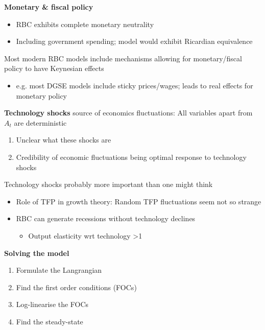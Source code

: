 \documentclass{beamer}
\begin{document}
\begin{frame}
  \textbf{Monetary \& fiscal policy}\\
   \begin{itemize}
     \item RBC exhibits complete monetary neutrality
     \item Including government spending; model would exhibit Ricardian equivalence
   \end{itemize}
   \medskip
    Most modern RBC models include mechanisms allowing for monetary/fiscal policy to have Keynesian effects
  \begin{itemize}
    \item e.g. most DGSE models include sticky prices/wages; leads to real effects for monetary policy
  \end{itemize}
\end{frame}

\begin{frame}
  \textbf{Technology shocks} source of economics fluctuations: All variables apart from $A_t$ are deterministic
  \begin{enumerate}
    \item Unclear what these shocks are
    \item Credibility of economic fluctuations being optimal response to technology shocks
  \end{enumerate}
  \medskip
  Technology shocks probably more important than one might think
  \begin{itemize}
    \item Role of TFP in growth theory: Random TFP fluctuations seem not so strange
    \item RBC can generate recessions without technology declines
    \begin{itemize}
      \item Output elasticity wrt technology >1
    \end{itemize}
  \end{itemize}
\end{frame}

\begin{frame}
 \textbf{Solving the model}
 \begin{enumerate}
  \item Formulate the Langrangian
  \item Find the first order conditions (FOCs)
  \item Log-linearise the FOCs
  \item Find the steady-state
\end{enumerate}
\end{frame}
\end{document}
